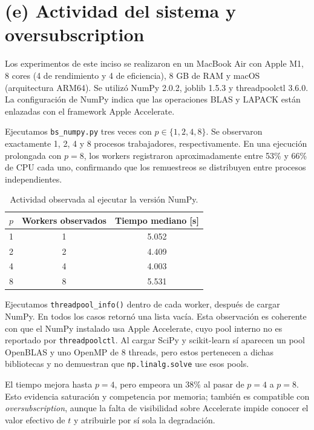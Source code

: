 \documentclass[12pt, letterpaper]{article}
\begin{document}
\section*{(e) Actividad del sistema y oversubscription}

Los experimentos de este inciso se realizaron en un MacBook Air con Apple M1,
8 cores (4 de rendimiento y 4 de eficiencia), 8 GB de RAM y macOS
(arquitectura ARM64). Se utilizó NumPy 2.0.2, joblib 1.5.3 y
threadpoolctl 3.6.0. La configuración de NumPy indica que las operaciones BLAS y
LAPACK están enlazadas con el framework Apple Accelerate.

Ejecutamos \texttt{bs\_numpy.py} tres veces con
$p\in\{1,2,4,8\}$. Se observaron exactamente 1, 2, 4 y 8 procesos trabajadores,
respectivamente. En una ejecución prolongada con $p=8$, los workers registraron
aproximadamente entre 53\% y 66\% de CPU cada uno, confirmando que los
remuestreos se distribuyen entre procesos independientes.

\begin{table}[h]
    \centering
    \begin{tabular}{|c|c|c|}
    \hline
    $p$ & \textbf{Workers observados} & \textbf{Tiempo mediano [s]} \\
    \hline
    1 & 1 & 5.052 \\
    2 & 2 & 4.409 \\
    4 & 4 & 4.003 \\
    8 & 8 & 5.531 \\
    \hline
    \end{tabular}
    \caption{Actividad observada al ejecutar la versión NumPy.}
\end{table}

Ejecutamos \texttt{threadpool\_info()} dentro de cada worker, después de cargar
NumPy. En todos los casos retornó una lista vacía. Esta observación es coherente
con que el NumPy instalado usa Apple Accelerate, cuyo pool interno no es
reportado por \texttt{threadpoolctl}. Al cargar SciPy y scikit-learn sí aparecen
un pool OpenBLAS y uno OpenMP de 8 threads, pero estos pertenecen a dichas
bibliotecas y no demuestran que \texttt{np.linalg.solve} use esos pools.

El tiempo mejora hasta $p=4$, pero empeora un 38\% al pasar de $p=4$ a $p=8$.
Esto evidencia saturación y competencia por memoria; también es compatible con
\textit{oversubscription}, aunque la falta de visibilidad sobre Accelerate
impide conocer el valor efectivo de $t$ y atribuirle por sí sola la degradación.
\end{document}
